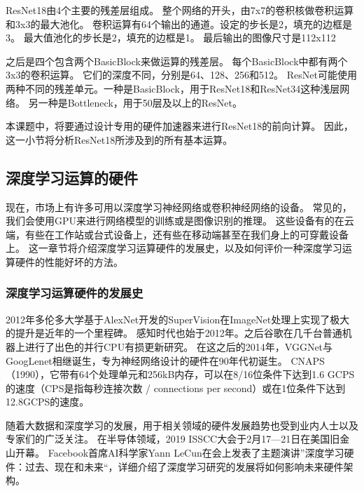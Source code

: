 ResNet18由4个主要的残差层组成。
整个网络的开头，由7x7的卷积核做卷积运算和3x3的最大池化。
卷积运算有64个输出的通道。设定的步长是2，填充的边框是3。
最大值池化的步长是2，填充的边框是1。
最后输出的图像尺寸是112x112

之后是四个包含两个BasicBlock来做运算的残差层。
每个BasicBlock中都有两个3x3的卷积运算。
它们的深度不同，分别是64、128、256和512。
ResNet可能使用两种不同的残差单元。一种是BasicBlock，用于ResNet18和ResNet34这种浅层网络。
另一种是Bottleneck，用于50层及以上的ResNet。

本课题中，将要通过设计专用的硬件加速器来进行ResNet18的前向计算。
因此，这一小节将分析ResNet18所涉及到的所有基本运算。


\subsection{深度学习运算的硬件}
现在，市场上有许多可用以深度学习神经网络或卷积神经网络的设备。
常见的，我们会使用GPU来进行网络模型的训练或是图像识别的推理。
这些设备有的在云端，有些在工作站或台式设备上，还有些在移动端甚至在我们身上的可穿戴设备上。
这一章节将介绍深度学习运算硬件的发展史，以及如何评价一种深度学习运算硬件的性能好坏的方法。


\subsubsection{深度学习运算硬件的发展史}
2012年多伦多大学基于AlexNet开发的SuperVision在ImageNet处理上实现了极大的提升是近年的一个里程碑。%
感知时代也始于2012年。之后谷歌在几千台普通机器上进行了出色的并行CPU有损更新研究。
在这之后的2014年，VGGNet与GoogLenet相继诞生，专为神经网络设计的硬件在90年代初诞生。
CNAPS（1990），它带有64个处理单元和256kB内存，可以在8/16位条件下达到1.6 GCPS的速度（CPS是指每秒连接次数 / connections per second）或在1位条件下达到12.8GCPS的速度。%

随着大数据和深度学习的发展，用于相关领域的硬件发展趋势也受到业内人士以及专家们的广泛关注。
在半导体领域，2019 ISSCC大会于2月17—21日在美国旧金山开幕。
Facebook首席AI科学家Yann LeCun在会上发表了主题演讲”深度学习硬件：过去、现在和未来“，详细介绍了深度学习研究的发展将如何影响未来硬件架构。%


